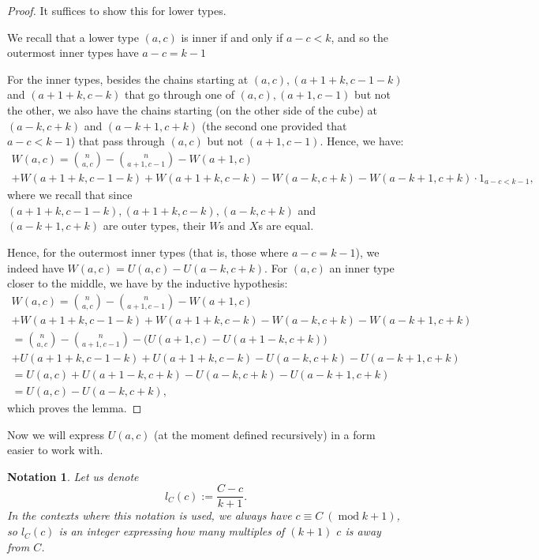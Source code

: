 \documentclass[11pt, reqno]{amsart}
\newtheorem*{notation}{Notation}
\numberwithin{equation}{section}
\newcommand\modd{\operatorname{mod}}
\begin{document}
\begin{proof}
    It suffices to show this for lower types.

    We recall that a lower type $(a, c)$ is inner if and only if $a-c<k$, and so the outermost inner types have $a-c=k-1$
    
    For the inner types, besides the chains starting at $(a, c), (a+1+k, c-1-k)$ and $(a+1+k, c-k)$ that go through one of $(a, c), (a+1, c-1)$ but not the other, we also have the chains starting (on the other side of the cube) at $(a-k, c+k)$ and $(a-k+1, c+k)$ (the second one provided that $a-c<k-1$) that pass through $(a, c)$ but not $(a+1, c-1)$. Hence, we have: 
    \begin{multline*}
        W(a, c)=\binom{n}{a, c} - \binom{n}{a+1, c-1} - W(a+1, c)\\ + W(a+1+k, c-1-k) + W(a+1+k, c-k) - W(a-k, c+k) - W(a-k+1, c+k) \cdot 1_{a-c<k-1},
    \end{multline*}
    where we recall that since $(a+1+k, c-1-k), (a+1+k, c-k), (a-k, c+k)$ and $(a-k+1, c+k)$ are outer types, their $W$s and $X$s are equal.
    
    Hence, for the outermost inner types (that is, those where $a-c=k-1$), we indeed have $W(a, c)=U(a, c)-U(a-k, c+k)$.
    For $(a, c)$ an inner type closer to the middle, we have by the inductive hypothesis:
    \begin{multline*}
        W(a, c)
        =\binom{n}{a, c} - \binom{n}{a+1, c-1} - W(a+1, c)\\ + W(a+1+k, c-1-k) + W(a+1+k, c-k) - W(a-k, c+k) - W(a-k+1, c+k)\\
        = \binom{n}{a, c} - \binom{n}{a+1, c-1} - \Big( U(a+1, c) - U(a+1-k, c+k) \Big)\\ + U(a+1+k, c-1-k) + U(a+1+k, c-k) - U(a-k, c+k) - U(a-k+1, c+k)\\
        = U(a, c) + U(a+1-k, c+k) - U(a-k, c+k) - U(a-k+1, c+k)\\ = U(a, c)-U(a-k, c+k),
    \end{multline*}
    which proves the lemma.
\end{proof}

Now we will express $U(a, c)$ (at the moment defined recursively) in a form easier to work with.

\begin{notation}
    Let us denote
    \begin{equation}
        l_C(c) := \frac{C-c}{k+1}.
    \end{equation}
    In the contexts where this notation is used, we always have $c \equiv C \ (\modd k+1)$, so $l_C(c)$ is an integer expressing how many multiples of $(k+1)$ $c$ is away from $C$.
\end{notation}
\end{document}
